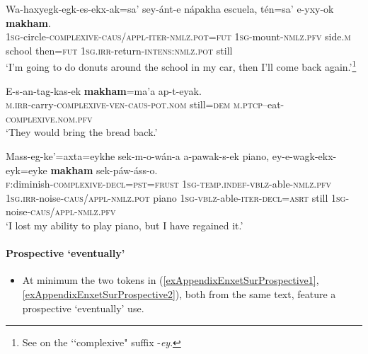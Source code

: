 \begin{exe}
	\ex\label{exAppendixEnxetSurRestitutive1}
	\gll Wa-haxyegk-egk-es-ekx-ak=sa’ sey-ánt-e nápakha escuela, tén=sa' e-yxy-ok \textbf{makham}.\\
	1\textsc{sg}-circle-\textsc{complexive}-\textsc{caus}/\textsc{appl}-\textsc{iter}-\textsc{nmlz}.\textsc{pot}=\textsc{fut} 1\textsc{sg}-mount-\textsc{nmlz}.\textsc{pfv} side.\textsc{m} school then=\textsc{fut} 1\textsc{sg}.\textsc{irr}-return-\textsc{intens}:\textsc{nmlz}.\textsc{pot} still\\
	\glt \lq I’m going to do donuts around the school in my car, then I’ll come back again.'\footnote{See \textcite[500–506]{Elliot2021} on the \lq\lq complexive" suffix \mbox{-\textit{ey}}.} \parencite[734]{Elliot2021}
	
	\ex\label{exAppendixEnxetSurRestitutive2}
	\gll E-s-an-tag-kas-ek \textbf{makham}=ma’a ap-t-eyak.\\
	\textsc{m}.\textsc{irr}-carry-\textsc{complexive}-\textsc{ven}-\textsc{caus}-\textsc{pot}.\textsc{nom} still=\textsc{dem} \textsc{m}.\textsc{ptcp}--eat-\textsc{complexive}.\textsc{nom}.\textsc{pfv}\\
	\glt \lq They would bring the bread back.' \parencite[180]{Elliot2021}

	\ex\label{exAppendixEnxetSurRestitutive3}
	\gll Mass-eg-ke’=axta=eykhe sek-m-o-wán-a a-pawak-s-ek piano, ey-e-wagk-ekx-eyk=eyke \textbf{makham} sek-páw-áss-o.\\
	\textsc{f}:diminish-\textsc{complexive}-\textsc{decl}=\textsc{pst}=\textsc{frust} 1\textsc{sg}-\textsc{temp}.\textsc{indef}-\textsc{vblz}-able-\textsc{nmlz}.\textsc{pfv} 1\textsc{sg}.\textsc{irr}-noise-\textsc{caus}/\textsc{appl}-\textsc{nmlz}.\textsc{pot} piano 1\textsc{sg}-\textsc{vblz}-able-\textsc{iter}-\textsc{decl}=\textsc{asrt} still 1\textsc{sg}-noise-\textsc{caus}/\textsc{appl}-\textsc{nmlz}.\textsc{pfv}\\
	\glt \lq I lost my ability to play piano, but I have regained it.\rq{ }\parencite[346–347]{Elliot2021}
\end{exe}

\paragraph{Prospective \lq eventually\rq{}}\label{appendixEnxetSurProspective}
\begin{itemize}
	\item At minimum the two tokens in (\ref{exAppendixEnxetSurProspective1}, \ref{exAppendixEnxetSurProspective2}), both from the same text, feature a prospective \lq{}eventually\rq{ }use.
\end{itemize}

